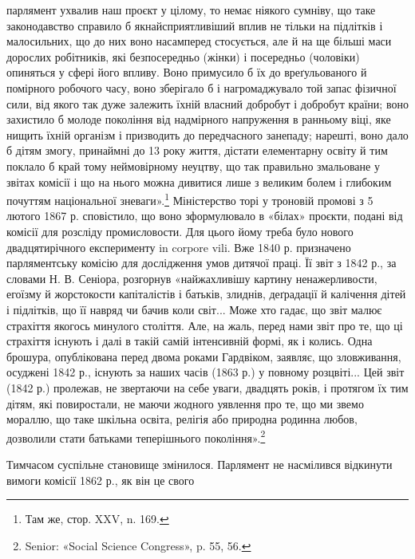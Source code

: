 \parcont{}  %
парлямент ухвалив наш проєкт у цілому, то немає ніякого сумніву,
що таке законодавство справило б якнайсприятливіший
вплив не тільки на підлітків і малосильних, що до них воно
насамперед стосується, але й на ще більші маси дорослих робітників,
які безпосередньо (жінки) і посередньо (чоловіки) опиняться
у сфері його впливу. Воно примусило б їх до вреґульованого
й помірного робочого часу, воно зберігало б і нагромаджувало
той запас фізичної сили, від якого так дуже залежить їхній
власний добробут і добробут країни; воно захистило б молоде
покоління від надмірного напруження в ранньому віці, яке
нищить їхній організм і призводить до передчасного занепаду;
нарешті, воно дало б дітям змогу, принаймні до 13 року життя,
дістати елементарну освіту й тим поклало б край тому неймовірному
неуцтву, що так правильно змальоване у звітах комісії
і що на нього можна дивитися лише з великим болем і глибоким
почуттям національної зневаги».\footnote{
Там же, стор. XXV, n. 169.
} Міністерство торі у троновій
промові з 5 лютого 1867 р. сповістило, що воно зформулювало в
«білах» проєкти, подані від комісії для розсліду промисловости.
Для цього йому треба було нового двадцятирічного
експерименту in corpore vili. Вже 1840 р. призначено парляментську
комісію для дослідження умов дитячої праці. Її звіт з 1842 р.,
за словами Н. В. Сеніора, розгорнув «найжахливішу картину
ненажерливости, егоїзму й жорстокости капіталістів і батьків,
злиднів, деґрадації й калічення дітей і підлітків, що її навряд
чи бачив коли світ... Може хто гадає, що звіт малює страхіття
якогось минулого століття. Але, на жаль, перед нами звіт про
те, що ці страхіття існують і далі в такій самій інтенсивній формі,
як і колись. Одна брошура, опублікована перед двома роками
Гардвіком, заявляє, що зловживання, осуджені 1842 р.,
існують за наших часів (1863 р.) у повному розцвіті... Цей звіт
(1842 р.) пролежав, не звертаючи на себе уваги, двадцять років,
і протягом їх тим дітям, які повиростали, не маючи жодного
уявлення про те, що ми звемо мораллю, що таке шкільна освіта,
релігія або природна родинна любов, дозволили стати батьками
теперішнього покоління».\footnote{
Senior: «Social Science Congress», p. 55, 56.
}

Тимчасом суспільне становище змінилося. Парлямент не
насмілився відкинути вимоги комісії 1862 р., як він це свого
\parbreak{}  %
